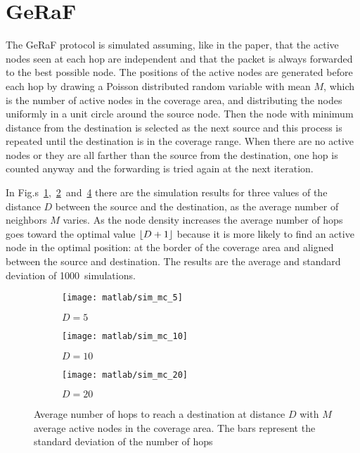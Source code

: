 \documentclass[a4paper,oneside]{article}
\begin{document}
\section{GeRaF}
The GeRaF protocol is simulated assuming, like in the paper, that the
active nodes seen at each hop are independent and that the packet is
always forwarded to the best possible node.
%
The positions of the active nodes are generated before each hop by
drawing a Poisson distributed random variable with mean $M$, which is
the number of active nodes in the coverage area, and distributing the
nodes uniformly in a unit circle around the source node.
%
Then the node with minimum distance from the destination is selected
as the next source and this process is repeated until the destination
is in the coverage range.
%
When there are no active nodes or they are all farther than the source
from the destination, one hop is counted anyway and the forwarding is
tried again at the next iteration.

In
Fig.s~\ref{plot:geraf_sim_5},~\ref{plot:geraf_sim_10}~and~\ref{plot:geraf_sim_20}
there are the simulation results for three values of the distance $D$
between the source and the destination, as the average number of
neighbors $M$ varies. As the node density increases the average number
of hops goes toward the optimal value $\left\lfloor D+1\right\rfloor$ because it is more
likely to find an active node in the optimal position: at the border
of the coverage area and aligned between the source and destination.
%
The results are the average and standard deviation of
1000~simulations.
\begin{figure}[htbp]
  \centering
  \begin{subfigure}{0.5\textwidth}
    \centering
    \texttt{[image: matlab/sim\_mc\_5]}
    \caption{$ D = 5 $}
    \label{plot:geraf_sim_5}
  \end{subfigure}%
  \begin{subfigure}{0.5\textwidth}
    \centering
    \texttt{[image: matlab/sim\_mc\_10]}
    \caption{$ D = 10 $}
    \label{plot:geraf_sim_10}
  \end{subfigure}
  \begin{subfigure}{0.5\textwidth}
    \centering
    \texttt{[image: matlab/sim\_mc\_20]}
    \caption{$ D = 20 $}
    \label{plot:geraf_sim_20}
  \end{subfigure}
  \caption{Average number of hops to reach a destination at distance
    $D$ with $M$ average active nodes in the coverage area. The bars
    represent the standard deviation of the number of hops}
\end{figure}
\end{document}
